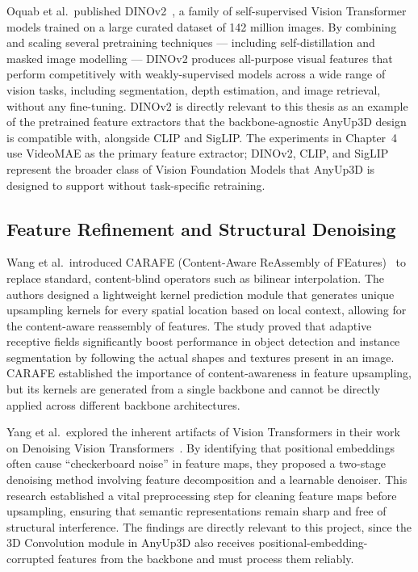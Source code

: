 Oquab et al.\ published DINOv2~\cite{dinov2}, a family
of self-supervised Vision Transformer models trained on a
large curated dataset of 142 million images.
By combining and scaling several pretraining techniques ---
including self-distillation and masked image modelling ---
DINOv2 produces all-purpose visual features that perform
competitively with weakly-supervised models across a wide range
of vision tasks, including segmentation, depth estimation, and
image retrieval, without any fine-tuning.
DINOv2 is directly relevant to this thesis as an example of the
pretrained feature extractors that the backbone-agnostic AnyUp3D
design is compatible with, alongside CLIP and SigLIP\@.
The experiments in Chapter~4 use VideoMAE as the primary feature
extractor; DINOv2, CLIP, and SigLIP represent the broader class
of Vision Foundation Models that AnyUp3D is designed to support
without task-specific retraining.

\subsection{Feature Refinement and Structural Denoising}

Wang et al.\ introduced CARAFE (Content-Aware
ReAssembly of FEatures)~\cite{carafe} to replace standard,
content-blind operators such as bilinear interpolation.
The authors designed a lightweight kernel prediction module
that generates unique upsampling kernels for every spatial
location based on local context, allowing for the
content-aware reassembly of features.
The study proved that adaptive receptive fields significantly
boost performance in object detection and instance
segmentation by following the actual shapes and textures
present in an image.
CARAFE established the importance of content-awareness in
feature upsampling, but its kernels are generated from a
single backbone and cannot be directly applied across
different backbone architectures.

Yang et al.\ explored the inherent artifacts of Vision
Transformers in their work on Denoising Vision
Transformers~\cite{denoising_vit}.
By identifying that positional embeddings often cause
``checkerboard noise'' in feature maps, they proposed a
two-stage denoising method involving feature decomposition and
a learnable denoiser.
This research established a vital preprocessing step for
cleaning feature maps before upsampling, ensuring that
semantic representations remain sharp and free of structural
interference.
The findings are directly relevant to this project, since the
3D Convolution module in AnyUp3D also receives
positional-embedding-corrupted features from the backbone and
must process them reliably.

